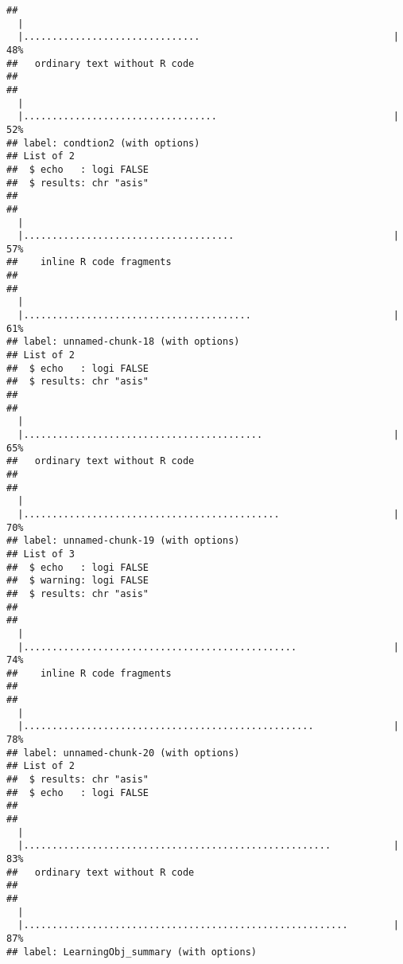 \documentclass{article}\usepackage[]{graphicx}\usepackage[]{color}
\makeatletter
\newenvironment{kframe}{%
 \def\at@end@of@kframe{}%
 \ifinner\ifhmode%
  \def\at@end@of@kframe{\end{minipage}}%
  \begin{minipage}{\columnwidth}%
 \fi\fi%
 \def\FrameCommand##1{\hskip\@totalleftmargin \hskip-\fboxsep
 \colorbox{shadecolor}{##1}\hskip-\fboxsep
     \hskip-\linewidth \hskip-\@totalleftmargin \hskip\columnwidth}%
 \MakeFramed {\advance\hsize-\width
   \@totalleftmargin\z@ \linewidth\hsize
   \@setminipage}}%
 {\par\unskip\endMakeFramed%
 \at@end@of@kframe}
\newenvironment{knitrout}{}{} %
\numberwithin{equation}{section} %
\makeatother
\begin{document}
\begin{knitrout}
\begin{kframe}
{\ttfamily\noindent\color{warningcolor}{\#\# Warning in `[<-.factor`(`*tmp*`, ri, value = "{} "{}): invalid factor level, NA generated}}

{\ttfamily\noindent\color{warningcolor}{\#\# Warning in `[<-.factor`(`*tmp*`, ri, value = "{} "{}): invalid factor level, NA generated}}\begin{verbatim}
## 
  |                                                                       
  |...............................                                  |  48%
##   ordinary text without R code
## 
## 
  |                                                                       
  |..................................                               |  52%
## label: condtion2 (with options) 
## List of 2
##  $ echo   : logi FALSE
##  $ results: chr "asis"
## 
## 
  |                                                                       
  |.....................................                            |  57%
##    inline R code fragments
## 
## 
  |                                                                       
  |........................................                         |  61%
## label: unnamed-chunk-18 (with options) 
## List of 2
##  $ echo   : logi FALSE
##  $ results: chr "asis"
## 
## 
  |                                                                       
  |..........................................                       |  65%
##   ordinary text without R code
## 
## 
  |                                                                       
  |.............................................                    |  70%
## label: unnamed-chunk-19 (with options) 
## List of 3
##  $ echo   : logi FALSE
##  $ warning: logi FALSE
##  $ results: chr "asis"
## 
## 
  |                                                                       
  |................................................                 |  74%
##    inline R code fragments
## 
## 
  |                                                                       
  |...................................................              |  78%
## label: unnamed-chunk-20 (with options) 
## List of 2
##  $ results: chr "asis"
##  $ echo   : logi FALSE
## 
## 
  |                                                                       
  |......................................................           |  83%
##   ordinary text without R code
## 
## 
  |                                                                       
  |.........................................................        |  87%
## label: LearningObj_summary (with options) 

\end{verbatim}
\end{kframe}
\end{knitrout}
\end{document}
